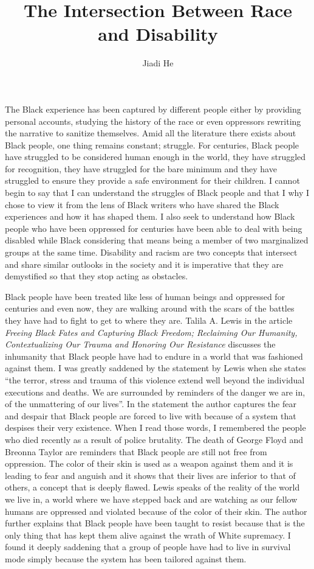 \documentclass[11pt]{article}
\title{The Intersection Between Race and Disability}
\author{Jiadi He}
\affil{Georgetown University}
\begin{document}
\maketitle
\keywordsline

The Black experience has been captured by different people either by providing personal accounts, studying the history of the race or even oppressors rewriting the narrative to sanitize themselves. Amid all the literature there exists about Black people, one thing remains constant; struggle. For centuries, Black people have struggled to be considered human enough in the world, they have struggled for recognition, they have struggled for the bare minimum and they have struggled to ensure they provide a safe environment for their children. I cannot begin to say that I can understand the struggles of Black people and that I why I chose to view it from the lens of Black writers who have shared the Black experiences and how it has shaped them. I also seek to understand how Black people who have been oppressed for centuries have been able to deal with being disabled while Black considering that means being a member of two marginalized groups at the same time. Disability and racism are two concepts that intersect and share similar outlooks in the society and it is imperative that they are demystified so that they stop acting as obstacles.

Black people have been treated like less of human beings and oppressed for centuries and even now, they are walking around with the scars of the battles they have had to fight to get to where they are. Talila A. Lewis in the article \textit{Freeing Black Fates and Capturing Black Freedom; Reclaiming Our Humanity, Contextualizing Our Trauma and Honoring Our Resistance} discusses the inhumanity that Black people have had to endure in a world that was fashioned against them. I was greatly saddened by the statement by Lewis when she states “the terror, stress and trauma of this violence extend well beyond the individual executions and deaths. We are surrounded by reminders of the danger we are in, of the unmattering of our lives”. In the statement the author captures the fear and despair that Black people are forced to live with because of a system that despises their very existence. When I read those words, I remembered the people who died recently as a result of police brutality. The death of George Floyd and Breonna Taylor are reminders that Black people are still not free from oppression. The color of their skin is used as a weapon against them and it is leading to fear and anguish and it shows that their lives are inferior to that of others, a concept that is deeply flawed. Lewis speaks of the reality of the world we live in, a world where we have stepped back and are watching as our fellow humans are oppressed and violated because of the color of their skin. The author further explains that Black people have been taught to resist because that is the only thing that has kept them alive against the wrath of White supremacy. I found it deeply saddening that a group of people have had to live in survival mode simply because the system has been tailored against them.
\end{document}
